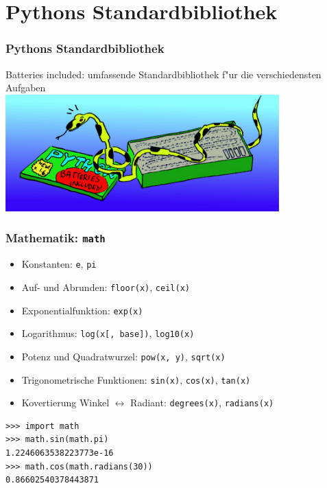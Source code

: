 \section{Pythons Standardbibliothek}

\begin{frame}
\frametitle{Pythons Standardbibliothek}
\alert{\glqq Batteries included\grqq}: umfassende Standardbibliothek f"ur die verschiedensten Aufgaben\\[4mm]

\includegraphics[height=4.5cm]{images/batteries_included.jpg}
\end{frame}

\begin{frame}[fragile]
\frametitle{Mathematik: \texttt{math}}
\begin{itemize}
\item Konstanten: \texttt{e}, \texttt{pi}
\item Auf- und Abrunden: \texttt{floor(x)}, \texttt{ceil(x)}
\item Exponentialfunktion: \texttt{exp(x)}
\item Logarithmus: \texttt{log(x[, base])}, \texttt{log10(x)}
\item Potenz und Quadratwurzel: \texttt{pow(x, y)}, \texttt{sqrt(x)}
\item Trigonometrische Funktionen: \texttt{sin(x)}, \texttt{cos(x)}, \texttt{tan(x)}
\item Kovertierung Winkel $\leftrightarrow$ Radiant: \texttt{degrees(x)}, \texttt{radians(x)}
\end{itemize}
\begin{lstlisting}[style=Shell]
>>> import math
>>> math.sin(math.pi)
1.2246063538223773e-16
>>> math.cos(math.radians(30))
0.86602540378443871
\end{lstlisting}
\end{frame}

